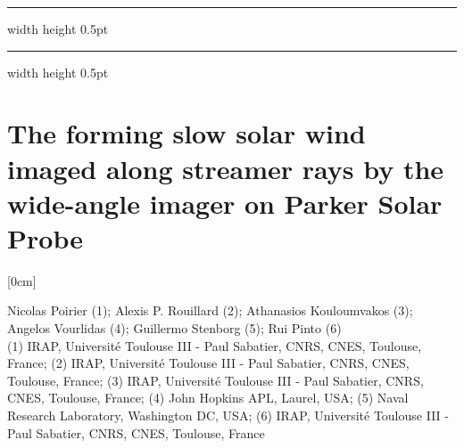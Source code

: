 \documentclass[a4paper,11pt]{book}
\def\doubleline{
\hrule width \hsize height 0.5pt  \kern 1mm \hrule width \hsize height 0.5pt 
}
\begin{document}
\noindent\doubleline
        
          \section[The forming slow solar wind imaged along streamer rays by the wide-angle imager on Parker Solar Probe \newline(Nicolas Poirier)] { The forming slow solar wind imaged along streamer rays by the wide-angle imager on Parker Solar Probe }



[0cm]



\begin{center}
    
{\large Nicolas Poirier (1)};{ \large Alexis P. Rouillard (2)};{ \large Athanasios Kouloumvakos (3)};{ \large Angelos Vourlidas (4)};{ \large Guillermo Stenborg (5)};{ \large Rui Pinto (6)}\\
  
\vspace{2 mm}
\noindent (1) IRAP, Université Toulouse III - Paul Sabatier, CNRS, CNES, Toulouse, France; (2) IRAP, Université Toulouse III - Paul Sabatier, CNRS, CNES, Toulouse, France; (3) IRAP, Université Toulouse III - Paul Sabatier, CNRS, CNES, Toulouse, France; (4) John Hopkins APL, Laurel, USA; (5) Naval Research Laboratory, Washington DC, USA; (6) IRAP, Université Toulouse III - Paul Sabatier, CNRS, CNES, Toulouse, France\\

\end{center}



  
\end{document}
